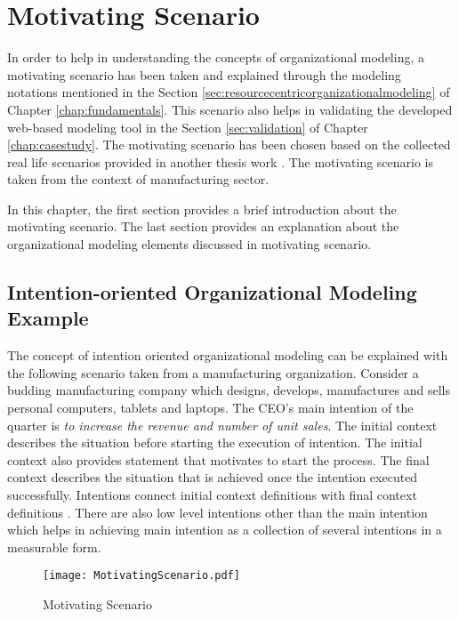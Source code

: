 \chapter{Motivating Scenario}
\label{chap:motivatingScenario}
In order to help in understanding the concepts of organizational modeling, a motivating scenario has been taken and explained through the modeling notations mentioned in the Section \ref{sec:resourcecentricorganizationalmodeling} of Chapter \ref{chap:fundamentals}. This scenario also helps in validating the developed web-based modeling tool in the Section \ref{sec:validation} of Chapter \ref{chap:casestudy}. The motivating scenario has been chosen based on the collected real life scenarios provided in another thesis work \cite{Sierr2015}. The motivating scenario is taken from the context of manufacturing sector. 

In this chapter, the first section provides a brief introduction about the motivating scenario. The last section provides an explanation about the organizational modeling elements discussed in motivating scenario. 
\section{Intention-oriented Organizational Modeling Example}
\label{sec:scenario}
 The concept of intention oriented organizational modeling can be explained with the following scenario taken from a manufacturing organization. Consider a budding manufacturing company which designs, develops, manufactures and sells personal computers, tablets and laptops. The CEO's main intention of the quarter is \textit{to increase the revenue and number of unit sales}. The initial context describes the situation before starting the execution of intention. The initial context also provides statement that motivates to start the process. The final context describes the situation that is achieved once the intention executed successfully. Intentions connect initial context definitions with final context definitions \cite{Sungur2014a}. There are also low level intentions other than the main intention which helps in achieving main intention as a collection of several intentions in a measurable form. 
 
  \begin{figure}
  	\centering
  	\texttt{[image: MotivatingScenario.pdf]}
  	\caption{Motivating Scenario}
  	\label{fig:motivatingscenario}
  \end{figure}
  
